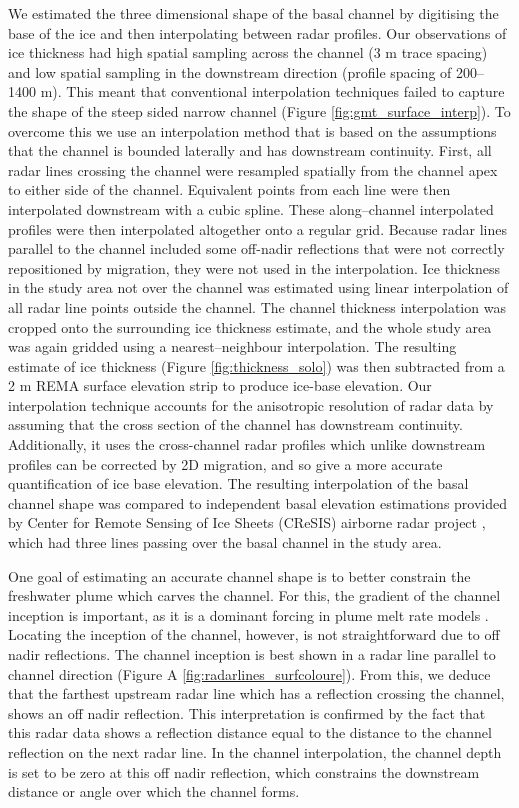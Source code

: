 We estimated the three dimensional shape of the basal channel by digitising the base of the ice and then interpolating between radar profiles. Our observations of ice thickness had high spatial sampling across the channel (3 m trace spacing) and low spatial sampling in the downstream direction (profile spacing of 200--1400 m). This meant that conventional interpolation techniques failed to capture the shape of the steep sided narrow channel (Figure \ref{fig:gmt_surface_interp}). To overcome this we use an interpolation method that is based on the assumptions that the channel is bounded laterally and has downstream continuity. First, all radar lines crossing  the channel were resampled spatially from the channel apex to either side of the channel. Equivalent points from each line were then interpolated downstream with a cubic spline. These along--channel interpolated  profiles were then interpolated altogether onto a regular grid.  Because radar lines parallel to the channel included some off-nadir reflections that were not correctly repositioned by migration, they were not used in the interpolation. Ice thickness in the study area not over the channel was estimated using linear interpolation of all radar line points outside the channel. The channel thickness interpolation was cropped onto the surrounding ice thickness estimate, and the whole study area was again gridded using a nearest--neighbour interpolation. The resulting estimate of ice thickness (Figure \ref{fig:thickness_solo}) was then subtracted from a 2 m REMA surface elevation strip to produce ice-base elevation.
Our interpolation technique accounts for the anisotropic resolution of radar data by assuming that the cross section of the channel has downstream continuity. Additionally, it uses the cross-channel radar profiles which unlike downstream profiles can be corrected by 2D migration, and so give a more accurate quantification of ice base elevation. 
The resulting interpolation of the basal channel shape was compared to  independent basal elevation estimations provided by Center for Remote Sensing of Ice Sheets (CReSIS) airborne radar project \citep{arnold2020cresis}, which had three lines passing over the basal channel in the study area.  

One goal of estimating an accurate channel shape is to better constrain the freshwater plume which carves the channel. For this, the gradient of the channel inception is important, as it is a dominant forcing in plume melt rate models \citep{jenkins1991one}. Locating the inception of the channel, however, is not straightforward due to off nadir reflections. The channel inception is best shown in a radar line parallel to channel direction (Figure A \ref{fig:radarlines_surfcoloure}). From this, we deduce that the farthest upstream radar line which has a reflection crossing the channel, shows an off nadir reflection. This interpretation is confirmed by the fact that this radar data shows a reflection distance equal to the distance to the channel reflection on the next radar line.  In the channel interpolation, the channel depth is set to be zero at this off nadir reflection, which constrains the downstream distance or angle over which the channel forms.



